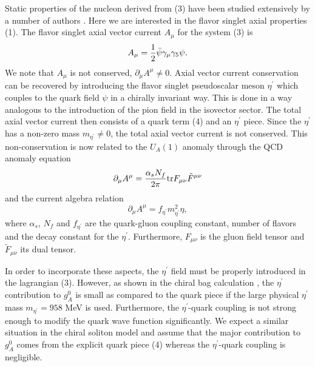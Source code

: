 Static properties  of the nucleon derived from (3) have  been studied     
extensively by a number of authors \cite{BB,BG}.
Here we are interested in the flavor
singlet axial properties (1).
The flavor singlet axial vector current $A_\mu$ for the system (3) is
\begin{equation}
A_\mu = {1 \over 2} \bar \psi \gamma _\mu \gamma _5 \psi .
\end{equation}
We note that  $A_\mu$ is not conserved, $\partial _\mu A^\mu \neq 0$.
Axial vector current conservation can be recovered by
introducing the flavor singlet
pseudoscalar meson $\eta ^\prime$ which couples
to the quark field $\psi$ in a chirally invariant way.  This is done in a
  way analogous to the introduction of the pion field in the          
isovector sector.  The total axial vector current then 
consists of a quark
term  (4) and an $\eta ^\prime$ piece.  Since the $\eta ^\prime$
has a non-zero mass $m_{\eta^\prime} \neq 0$,
the total axial vector current is not conserved.
This non-conservation is now related to the $U_A(1)$
anomaly through the QCD anomaly equation \cite{ChL}
\begin{equation}
\partial _\mu A^\mu = {{\alpha_s N_f} \over {2 \pi}}
               \hbox{tr} F_{\mu \nu} \tilde F^{\mu \nu}
\end{equation}
and the current algebra relation
\begin{equation}
\partial _\mu A^\mu = f_{\eta ^\prime } m^2_{\eta ^\prime } \eta ,
\end{equation}
where $\alpha_s$, $N_f$ and $f_{\eta^\prime}$ are the quark-gluon coupling
constant, number of flavors and the decay constant for the
$\eta ^\prime$.  Furthermore, $F_{\mu \nu}$ is the gluon field tensor
and $\tilde F_{\mu \nu}$ its dual tensor.

In order to incorporate these aspects, the $\eta ^\prime$ field must be
properly introduced in the lagrangian (3).
However, as shown in the chiral bag calculation \cite{PH},
the $\eta ^\prime$ contribution to $g_A^0$ is small as compared to the quark
piece if the large physical  $\eta ^\prime$ mass
 $m_{\eta^\prime} = 958$ MeV is used.
Furthermore, the $\eta ^\prime$-quark coupling is not  strong enough to
modify the quark wave function significantly.  We expect a   similar
situation in the chiral soliton model and assume that the major
contribution  to $g_A^0$ comes from the explicit  quark piece (4)
whereas the $\eta ^\prime$-quark coupling is negligible.

